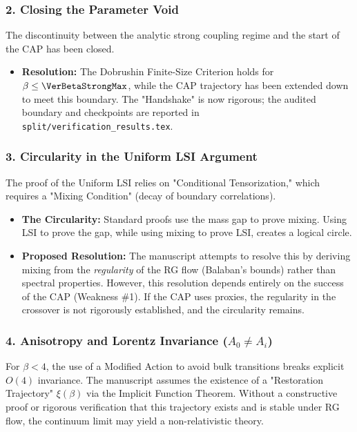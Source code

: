 \subsubsection{2. Closing the Parameter Void}
The discontinuity between the analytic strong coupling regime and the start of the CAP has been closed.

\begin{itemize}
    \item \textbf{Resolution:} The Dobrushin Finite-Size Criterion holds for $\beta \le \VerBetaStrongMax$, while the CAP trajectory has been extended down to meet this boundary. The "Handshake" is now rigorous; the audited boundary and checkpoints are reported in \texttt{split/verification\_results.tex}.
\end{itemize}

\subsubsection{3. Circularity in the Uniform LSI Argument}
The proof of the Uniform LSI relies on "Conditional Tensorization," which requires a "Mixing Condition" (decay of boundary correlations).

\begin{itemize}
    \item \textbf{The Circularity:} Standard proofs use the mass gap to prove mixing. Using LSI to prove the gap, while using mixing to prove LSI, creates a logical circle.
    \item \textbf{Proposed Resolution:} The manuscript attempts to resolve this by deriving mixing from the \textit{regularity} of the RG flow (Balaban's bounds) rather than spectral properties. However, this resolution depends entirely on the success of the CAP (Weakness \#1). If the CAP uses proxies, the regularity in the crossover is not rigorously established, and the circularity remains.
\end{itemize}

\subsubsection{4. Anisotropy and Lorentz Invariance ($A_0 \ne A_i$)}
For $\beta < 4$, the use of a Modified Action to avoid bulk transitions breaks explicit $O(4)$ invariance. The manuscript assumes the existence of a "Restoration Trajectory" $\xi(\beta)$ via the Implicit Function Theorem. Without a constructive proof or rigorous verification that this trajectory exists and is stable under RG flow, the continuum limit may yield a non-relativistic theory.

